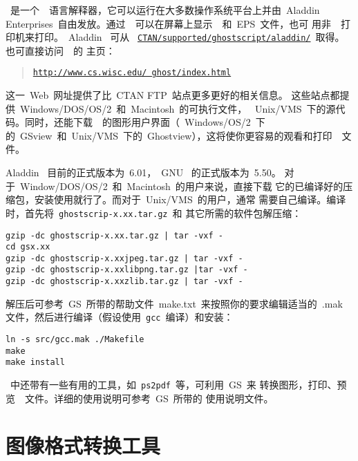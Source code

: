 \GS~是一个~\PS~语言解释器，它可以运行在大多数操作系统平台上并由~Aladdin
Enterprises~自由发放。通过~\GS~可以在屏幕上显示~\PS~和~EPS~文件，也可
用非~\PS~打印机来打印。~Aladdin \GS~可从
~\href{ftp://ftp.ctan.tug/tex-archive/supported/ghostscript/aladdin/}%
{\texttt{CTAN/supported/ghostscript/aladdin/}}~取得。也可直接访问~\GS~的
主页：
\begin{quote}
	\href{http://www.cs.wisc.edu/~ghost/index.html}{\texttt{http://www.cs.wisc.edu/~ghost/index.html}}
\end{quote}
这一~Web~网址提供了比~CTAN FTP~站点更多更好的相关信息。
这些站点都提供~Windows/DOS/OS{\small /}2~和~Macintosh~的可执行文件，
~Unix/VMS~下的源代码。同时，还能下载~\GS~的图形用户界面（~Windows/OS/2~下
的~GSview~和~Unix/VMS~下的~Ghostview），这将使你更容易的观看和打印~\PS~文件。

Aladdin \GS~目前的正式版本为~6.01，~GNU \GS~的正式版本为~5.50。
对于~Window/DOS/OS{\small /}2~和~Macintosh~的用户来说，直接下载
它的已编译好的压缩包，安装使用就行了。而对于~Unix/VMS~的用户，通常
需要自己编译。编译时，首先将~\texttt{ghostscrip-x.xx.tar.gz}~和
其它所需的软件包解压缩：
\begin{Verbatim}[xleftmargin=1cm]
gzip -dc ghostscrip-x.xx.tar.gz | tar -vxf -
cd gsx.xx
gzip -dc ghostscrip-x.xxjpeg.tar.gz | tar -vxf -
gzip -dc ghostscrip-x.xxlibpng.tar.gz |tar -vxf -
gzip -dc ghostscrip-x.xxzlib.tar.gz | tar -vxf -
\end{Verbatim}
解压后可参考~GS~所带的帮助文件~make.txt~来按照你的要求编辑适当的~.mak~
文件，然后进行编译（假设使用~\texttt{gcc}~编译）和安装：
\begin{Verbatim}[xleftmargin=1cm]
ln -s src/gcc.mak ./Makefile
make
make install
\end{Verbatim}

\GS~中还带有一些有用的工具，如~\texttt{ps2pdf}~等，可利用~GS~来
转换图形，打印、预览~\PS~文件。详细的使用说明可参考~GS~所带的
使用说明文件。

\section{图像格式转换工具}\label{sec:convertor}

